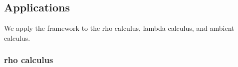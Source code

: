 \documentclass{article}
\begin{document}
\subsection{Applications}

We apply the framework to the rho calculus, lambda calculus, and ambient calculus.

\subsubsection*{rho calculus}


\end{document}
